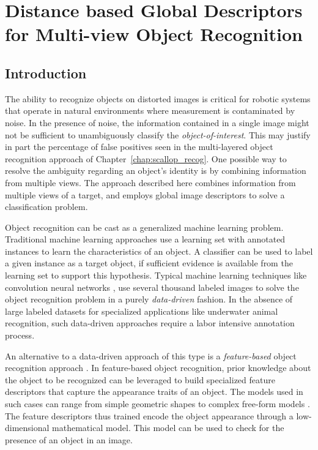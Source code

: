 
\chapter{Distance based Global Descriptors for Multi-view Object Recognition}
\label{chap:distdes}

\section{Introduction}

The ability to recognize objects on distorted images is critical for robotic systems that operate in natural environments where measurement is contaminated by noise. In the presence of noise, the information contained in a single image might not be sufficient to unambiguously classify the \emph{object-of-interest}. This may justify in part the percentage of false positives seen in the multi-layered object recognition approach of Chapter~\ref{chap:scallop_recog}.
One possible way to resolve the ambiguity regarding an object's identity is by combining information from multiple views. The approach described here combines information from multiple views of a target, and employs global image descriptors to solve a classification problem.

Object recognition can be cast as a generalized machine learning problem.
Traditional machine learning approaches \cite{alpaydin} use a learning set with annotated instances to learn the characteristics of an object. A classifier can be used to label a given instance as a target object, if sufficient evidence is available from the learning set to support this hypothesis. Typical machine learning techniques like convolution neural networks \cite{cnn}, use several thousand labeled images to solve the object recognition problem in a purely \emph{data-driven} fashion. In the absence of large labeled datasets for specialized applications like underwater animal recognition, such data-driven approaches require a labor intensive annotation process.

An alternative to a data-driven approach of this type is a \emph{feature-based} object recognition approach \cite{roth}. In feature-based object recognition, prior knowledge about the object to be recognized can be leveraged to build specialized feature descriptors that capture the appearance traits of an object. The models used in such cases can range from simple geometric shapes to complex free-form models \cite{campbell, belongie}. The feature descriptors thus trained encode the object appearance through a low-dimensional mathematical model. This model can be used to check for the presence of an object in an image.

